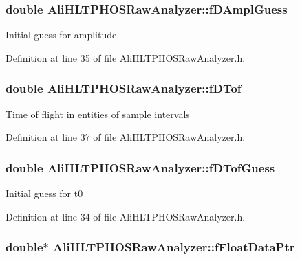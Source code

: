 \subsubsection{\setlength{\rightskip}{0pt plus 5cm}double {\bf Ali\-HLTPHOSRaw\-Analyzer::f\-DAmpl\-Guess}\hspace{0.3cm}{\tt  [protected, inherited]}}\label{classAliHLTPHOSRawAnalyzer_AliHLTPHOSRawAnalyzerPeakFinderp3}


Initial guess for amplitude 

Definition at line 35 of file Ali\-HLTPHOSRaw\-Analyzer.h.
\subsubsection{\setlength{\rightskip}{0pt plus 5cm}double {\bf Ali\-HLTPHOSRaw\-Analyzer::f\-DTof}\hspace{0.3cm}{\tt  [protected, inherited]}}\label{classAliHLTPHOSRawAnalyzer_AliHLTPHOSRawAnalyzerPeakFinderp5}


Time of flight in entities of sample intervals 

Definition at line 37 of file Ali\-HLTPHOSRaw\-Analyzer.h.
\subsubsection{\setlength{\rightskip}{0pt plus 5cm}double {\bf Ali\-HLTPHOSRaw\-Analyzer::f\-DTof\-Guess}\hspace{0.3cm}{\tt  [protected, inherited]}}\label{classAliHLTPHOSRawAnalyzer_AliHLTPHOSRawAnalyzerPeakFinderp2}


Initial guess for t0 

Definition at line 34 of file Ali\-HLTPHOSRaw\-Analyzer.h.
\subsubsection{\setlength{\rightskip}{0pt plus 5cm}double$\ast$ {\bf Ali\-HLTPHOSRaw\-Analyzer::f\-Float\-Data\-Ptr}\hspace{0.3cm}{\tt  [protected, inherited]}}\label{classAliHLTPHOSRawAnalyzer_AliHLTPHOSRawAnalyzerPeakFinderp0}


